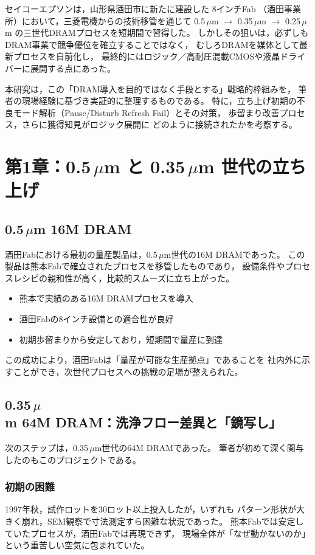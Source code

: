 \documentclass[conference]{IEEEtran}
\begin{document}
セイコーエプソンは，山形県酒田市に新たに建設した 8インチFab
（酒田事業所）において，三菱電機からの技術移管を通じて
0.5\,$\mu$m $\rightarrow$ 0.35\,$\mu$m $\rightarrow$ 0.25\,$\mu$m
の三世代DRAMプロセスを短期間で習得した。
しかしその狙いは，必ずしもDRAM事業で競争優位を確立することではなく，
むしろDRAMを媒体として最新プロセスを自前化し，
最終的にはロジック／高耐圧混載CMOSや液晶ドライバーに展開する点にあった。

本研究は，この「DRAM導入を目的ではなく手段とする」戦略的枠組みを，
筆者の現場経験に基づき実証的に整理するものである。
特に，立ち上げ初期の不良モード解析（Pause/Disturb Refresh Fail）とその対策，
歩留まり改善プロセス，さらに獲得知見がロジック展開に
どのように接続されたかを考察する。

\section{第1章：0.5\,\texorpdfstring{$\mu$m}{μm} と 0.35\,\texorpdfstring{$\mu$m}{μm} 世代の立ち上げ}

\subsection{0.5\,$\mu$m 16M DRAM}
酒田Fabにおける最初の量産製品は，0.5\,$\mu$m世代の16M DRAMであった。
この製品は熊本Fabで確立されたプロセスを移管したものであり，
設備条件やプロセスレシピの親和性が高く，比較的スムーズに立ち上がった。

\begin{itemize}
  \item 熊本で実績のある16M DRAMプロセスを導入
  \item 酒田Fabの8インチ設備との適合性が良好
  \item 初期歩留まりから安定しており，短期間で量産に到達
\end{itemize}

この成功により，酒田Fabは「量産が可能な生産拠点」であることを
社内外に示すことができ，次世代プロセスへの挑戦の足場が整えられた。

\subsection{0.35\,$\mu$m 64M DRAM：洗浄フロー差異と「鏡写し」}
次のステップは，0.35\,$\mu$m世代の64M DRAMであった。
筆者が初めて深く関与したのもこのプロジェクトである。

\subsubsection{初期の困難}
1997年秋，試作ロットを30ロット以上投入したが，いずれも
パターン形状が大きく崩れ，SEM観察で寸法測定すら困難な状況であった。
熊本Fabでは安定していたプロセスが，酒田Fabでは再現できず，
現場全体が「なぜ動かないのか」という重苦しい空気に包まれていた。
\end{document}
